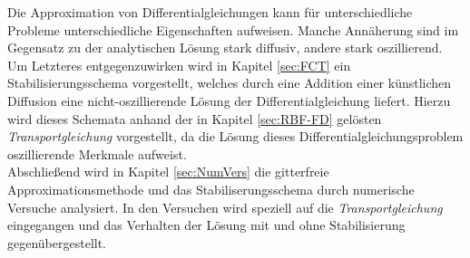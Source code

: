 \documentclass[12pt,titlepage]{article}
\begin{document}
Die Approximation von Differentialgleichungen kann für unterschiedliche Probleme unterschiedliche Eigenschaften aufweisen. Manche Annäherung sind im Gegensatz zu der analytischen Lösung stark diffusiv, andere stark oszillierend. Um Letzteres entgegenzuwirken wird in Kapitel \ref{sec:FCT} ein Stabilisierungsschema vorgestellt, welches durch eine Addition einer künstlichen Diffusion eine nicht-oszillierende Lösung der Differentialgleichung liefert. Hierzu wird dieses Schemata anhand der in Kapitel \ref{sec:RBF-FD} gelösten \textit{Transportgleichung} vorgestellt, da die Lösung dieses Differentialgleichungsproblem oszillierende Merkmale aufweist.\\
Abschließend wird in Kapitel \ref{sec:NumVers} die gitterfreie Approximationsmethode und das Stabiliserungsschema durch numerische Versuche analysiert. In den Versuchen wird speziell auf die \textit{Transportgleichung} eingegangen und das Verhalten der Lösung mit und ohne Stabilisierung gegenübergestellt.
\pagebreak
\end{document}
